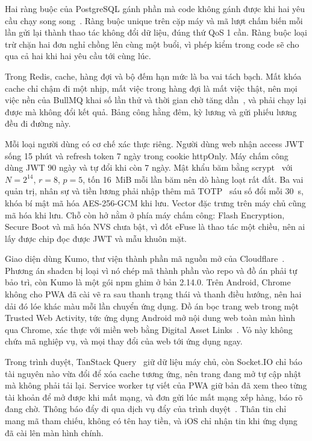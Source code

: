 \documentclass[../DoAn.tex]{subfiles}
\begin{document}
Hai ràng buộc của PostgreSQL gánh phần mà code không gánh được khi hai yêu cầu
chạy song song~\cite{pgconstraints}. Ràng buộc unique trên cặp máy và mã lượt chấm
biến mỗi lần gửi lại thành thao tác không đổi dữ liệu, đúng thứ QoS 1 cần. Ràng buộc
loại trừ chặn hai đơn nghỉ chồng lên cùng một buổi, vì phép kiểm trong code sẽ cho
qua cả hai khi hai yêu cầu tới cùng lúc.

Trong Redis, cache, hàng đợi và bộ đếm hạn mức là ba vai tách bạch. Mất khóa cache chỉ
chậm đi một nhịp, mất việc trong hàng đợi là mất việc thật, nên mọi việc nền của
BullMQ khai số lần thử và thời gian chờ tăng dần~\cite{bullmqretry}, và phải chạy
lại được mà không đổi kết quả. Bảng công hằng đêm, kỳ lương và gửi phiếu lương đều
đi đường này.

Mỗi loại người dùng có cơ chế xác thực riêng. Người dùng web nhận access
JWT~\cite{jwt} sống 15 phút và refresh token 7 ngày trong cookie httpOnly. Máy chấm
công dùng JWT 90 ngày và tự đổi khi còn 7 ngày. Mật khẩu băm bằng
scrypt~\cite{scrypt} với $N = 2^{14}$, $r = 8$, $p = 5$, tốn 16~MiB mỗi lần băm nên
dò hàng loạt rất đắt. Ba vai quản trị, nhân sự và tiền lương phải nhập thêm mã
TOTP~\cite{totp} sáu số đổi mỗi 30~s, khóa bí mật mã hóa AES-256-GCM khi lưu.
Vector đặc trưng trên máy chủ cũng mã hóa khi lưu. Chỗ còn hở nằm ở phía máy chấm
công: Flash Encryption, Secure Boot và mã hóa NVS chưa bật, vì đốt eFuse là thao tác
một chiều, nên ai lấy được chip đọc được JWT và mẫu khuôn mặt.

Giao diện dùng Kumo, thư viện thành phần mã nguồn mở của Cloudflare~\cite{kumo}.
Phương án shadcn bị loại vì nó chép mã thành phần vào repo và đồ án phải tự bảo
trì, còn Kumo là một gói npm ghim ở bản 2.14.0. Trên Android, Chrome không cho PWA
đã cài vẽ ra sau thanh trạng thái và thanh điều hướng, nên hai dải đó lóe khác màu mỗi lần chuyển ứng dụng. Đồ án bọc
trang web trong một Trusted Web Activity, tức ứng dụng Android mở nội dung web toàn
màn hình qua Chrome, xác thực với miền web bằng Digital Asset Links~\cite{twa}. Vỏ này không chứa mã nghiệp vụ, và mọi thay đổi của web tới ứng dụng ngay.

Trong trình duyệt, TanStack Query~\cite{tanstack} giữ dữ liệu máy chủ, còn Socket.IO
chỉ báo tài nguyên nào vừa đổi để xóa cache tương ứng, nên trang đang mở tự cập nhật
mà không phải tải lại. Service worker tự viết của PWA giữ bản đã xem theo từng tài
khoản để mở được khi mất mạng, và đơn gửi lúc mất mạng xếp hàng, báo rõ đang chờ.
Thông báo đẩy đi qua dịch vụ đẩy của trình duyệt~\cite{webpush}. Thân tin chỉ mang
mã tham chiếu, không có tên hay tiền, và iOS chỉ nhận tin khi ứng dụng đã cài lên
màn hình chính.
\end{document}
